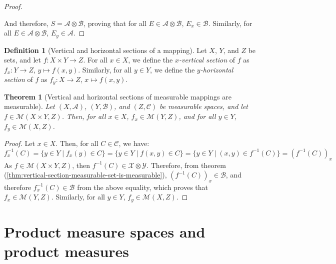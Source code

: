 \documentclass{article}
\newtheorem{theorem}{Theorem}[section]
\theoremstyle{definition}
\newtheorem{definition}{Definition}[section]
\theoremstyle{remark}
\theoremstyle{example}
\theoremstyle{notation}
\begin{document}
\begin{proof}
\begin{itemize}
\begin{itemize}
				\end{itemize}
		\end{itemize}
		And therefore, $S = \mathcal{A} \otimes \mathcal{B}$, proving that for all $E \in \mathcal{A} \otimes \mathcal{B}$, $E_x \in \mathcal{B}$. Similarly, for all $E \in \mathcal{A} \otimes \mathcal{B}$, $E_y \in \mathcal{A}$.
\end{proof}

\begin{definition}[Vertical and horizontal sections of a mapping]%
		Let $X$, $Y$, and $Z$ be sets, and let $f : X \times Y \rightarrow Z$. For all $x \in X$, we define the \textit{$x$-vertical section} of $f$ as $f_x : Y \rightarrow Z$, $y \mapsto f(x, y)$. Similarly, for all $y \in Y$, we define the \textit{$y$-horizontal section} of $f$ as $f_y : X \rightarrow Z$, $x \mapsto f(x, y)$.
\end{definition}

\begin{theorem}[Vertical and horizontal sections of measurable mappings are measurable] \label{thm:sections-measurable-mappings-are-measurable}
		Let $(X, \mathcal{A})$, $(Y, \mathcal{B})$, and $(Z, \mathcal{C})$ be measurable spaces, and let $f \in \mathcal{M}(X \times Y, Z)$. Then, for all $x \in X$, $f_x \in \mathcal{M}(Y, Z)$, and for all $y \in Y$, $f_y \in \mathcal{M}(X, Z)$.
\end{theorem}

\begin{proof}
		Let $x \in X$. Then, for all $C \in \mathcal{C}$, we have:
		$$f_x^{-1}(C) = \{y \in Y \mid f_x(y) \in C\} = \{y \in Y \mid f(x, y) \in C\} = \{y \in Y \mid (x, y) \in f^{-1}(C)\} = (f^{-1}(C))_x$$
		As $f \in \mathcal{M}(X \times Y, Z)$, then $f^{-1}(C) \in \mathcal{X} \otimes \mathcal{Y}$. Therefore, from theorem (\ref{thm:vertical-section-measurable-set-is-measurable}), $(f^{-1}(C))_x \in \mathcal{B}$, and therefore $f_x^{-1}(C) \in \mathcal{B}$ from the above equality, which proves that $f_x \in \mathcal{M}(Y, Z)$. Similarly, for all $y \in Y$, $f_y \in \mathcal{M}(X, Z)$.
\end{proof}

\section{Product measure spaces and product measures}
\end{document}
